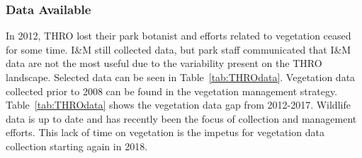 \subsubsection{Data Available}

In 2012, THRO lost their park botanist and efforts related to vegetation ceased for some time. 
I\&M still collected data, but park staff communicated that I\&M data are not the most useful due to the variability present on the THRO landscape. 
Selected data can be seen in Table~\ref{tab:THROdata}. 
Vegetation data collected prior to 2008 can be found in the vegetation management strategy. 
Table~\ref{tab:THROdata} shows the vegetation data gap from 2012-2017. 
Wildlife data is up to date and has recently been the focus of collection and management efforts. 
This lack of time on vegetation is the impetus for vegetation data collection
starting again in 2018.

